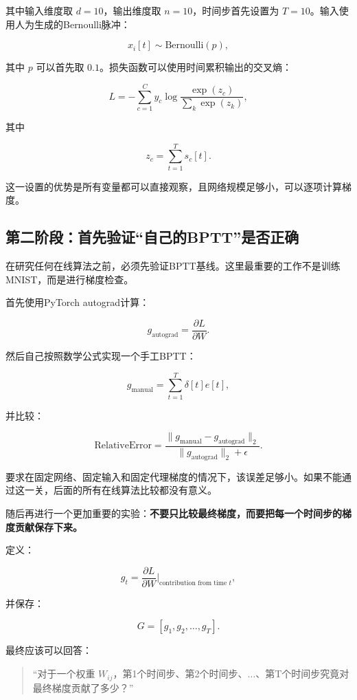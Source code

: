 \documentclass[journal,12pt,onecolumn]{IEEEtran}
\begin{document}
其中输入维度取 \(d=10\)，输出维度取 \(n=10\)，时间步首先设置为 \(T=10\)。输入使用人为生成的Bernoulli脉冲：

\[
x_i[t]\sim\mathrm{Bernoulli}(p),
\]

其中 \(p\) 可以首先取 \(0.1\)。损失函数可以使用时间累积输出的交叉熵：

\[
L
=
-\sum_{c=1}^{C}
y_c
\log
\frac{\exp(z_c)}
{\sum_{k}\exp(z_k)},
\]

其中

\[
z_c=\sum_{t=1}^{T}s_c[t].
\]

这一设置的优势是所有变量都可以直接观察，且网络规模足够小，可以逐项计算梯度。


\subsection{第二阶段：首先验证“自己的BPTT”是否正确}

在研究任何在线算法之前，必须先验证BPTT基线。这里最重要的工作不是训练MNIST，而是进行梯度检查。

首先使用PyTorch autograd计算：

\[
g_{\mathrm{autograd}}
=
\frac{\partial L}{\partial W}.
\]

然后自己按照数学公式实现一个手工BPTT：

\[
g_{\mathrm{manual}}
=
\sum_{t=1}^{T}
\delta[t]
e[t],
\]

并比较：

\[
\mathrm{RelativeError}
=
\frac{
\|g_{\mathrm{manual}}-g_{\mathrm{autograd}}\|_2
}{
\|g_{\mathrm{autograd}}\|_2+\epsilon
}.
\]

要求在固定网络、固定输入和固定代理梯度的情况下，该误差足够小。如果不能通过这一关，后面的所有在线算法比较都没有意义。

随后再进行一个更加重要的实验：\textbf{不要只比较最终梯度，而要把每一个时间步的梯度贡献保存下来。}

定义：

\[
g_t
=
\frac{\partial L}{\partial W}\bigg|_{\text{contribution from time }t},
\]

并保存：

\[
G=
[g_1,g_2,\ldots,g_T].
\]

最终应该可以回答：

\begin{quote}
“对于一个权重 \(W_{ij}\)，第1个时间步、第2个时间步、$\ldots$、第T个时间步究竟对最终梯度贡献了多少？”
\end{quote}
\end{document}

